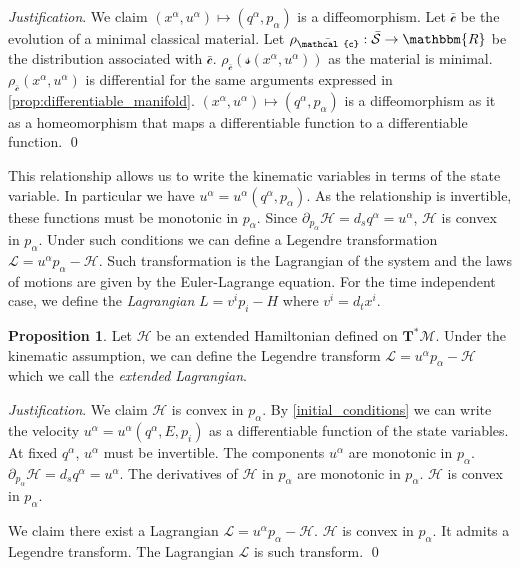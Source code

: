 \documentclass[aps,pra,10pt,twocolumn,floatfix,nofootinbib]{revtex4-1}
\numberwithin{equation}{section}
\theoremstyle{definition}
\newtheorem{prop}[equation]{Proposition}
\newenvironment{justification}{\emph{Justification}.}{\qed}
\begin{document}
\begin{justification}
	We claim $(x^\alpha, u^\alpha) \mapsto (q^\alpha, p_\alpha)$ is a diffeomorphism. Let $\bar{\mathcal{c}}$ be the evolution of a minimal classical material. Let $\rho_{\bar{\mathcal{c}}} : \bar{\mathcal{S}} \rightarrow \mathbbm{R}$ be the distribution associated with $\bar{\mathcal{c}}$. $\rho_{\bar{\mathcal{c}}}(\mathcal{s}(x^\alpha, u^\alpha))$ as the material is minimal. $\rho_{\bar{\mathcal{c}}}(x^\alpha, u^\alpha)$ is differential for the same arguments expressed in \ref{prop:differentiable_manifold}. $(x^\alpha, u^\alpha) \mapsto (q^\alpha, p_\alpha)$ is a diffeomorphism as it as a homeomorphism that maps a differentiable function to a differentiable function.
\end{justification}

This relationship allows us to write the kinematic variables in terms of the state variable. In particular we have $u^\alpha=u^\alpha(q^\alpha, p_\alpha)$. As the relationship is invertible, these functions must be monotonic in $p_\alpha$. Since $\partial_{p_\alpha} \mathcal{H}=d_s q^\alpha= u^\alpha$, $\mathcal{H}$ is convex in $p_\alpha$. Under such conditions we can define a Legendre transformation $\mathcal{L}=u^\alpha p_\alpha - \mathcal{H}$. Such transformation is the Lagrangian of the system and the laws of motions are given by the Euler-Lagrange equation. For the time independent case, we define the \emph{Lagrangian} $L=v^i p_i - H$ where $v^i=d_t x^i$.

\begin{prop}\label{lagrangian_mechanics}
	Let $\mathcal{H}$ be an extended Hamiltonian defined on $\mathbf{T}^*\mathcal{M}$. Under the kinematic assumption, we can define the Legendre transform $\mathcal{L}=u^\alpha p_\alpha - \mathcal{H}$ which we call the \emph{extended Lagrangian}.
\end{prop}

\begin{justification}
	We claim $\mathcal{H}$ is convex in $p_\alpha$. By \ref{initial_conditions} we can write the velocity $u^\alpha=u^\alpha(q^\alpha, E, p_i)$ as a differentiable function of the state variables. At fixed $q^\alpha$, $u^\alpha$ must be invertible. The components $u^\alpha$ are monotonic in $p_\alpha$. $\partial_{p_\alpha} \mathcal{H}=d_s q^\alpha= u^\alpha$. The derivatives of $\mathcal{H}$ in $p_\alpha$ are monotonic in $p_\alpha$. $\mathcal{H}$ is convex in $p_\alpha$.
	
	We claim there exist a Lagrangian $\mathcal{L}=u^\alpha p_\alpha - \mathcal{H}$. $\mathcal{H}$ is convex in $p_\alpha$. It admits a Legendre transform. The Lagrangian $\mathcal{L}$ is such transform.
\end{justification}
\end{document}
